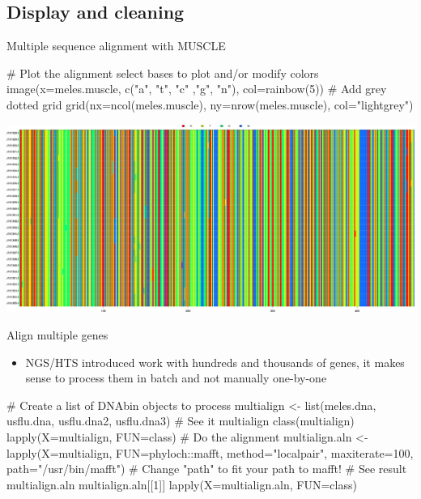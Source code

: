 \documentclass[compress, ucs, xelatex, 11pt, xcolor=svgnames,
  hyperref={
    bookmarks=true,
    unicode=true,
    colorlinks=true,
    pdftitle={Molecular data in R},
    plainpages=false,
    pdfauthor={Vojtech Zeisek},
    pdfsubject={Course about phylogeny and evolution in R},
    pdfcreator={XeLaTeX},
    pdfkeywords={R, evolution, phylogeny, molecular data},
    linkcolor=Tomato,
    anchorcolor=SaddleBrown,
    citecolor=Goldenrod,
    filecolor=DarkMagenta,
    menucolor=Sienna,
    urlcolor=DarkTurquoise,
    pdftex},
  url={hyphens, lowtilde} %
  ]{beamer}
\begin{document}
\subsection{Display and cleaning}

\begin{frame}[fragile]{Multiple sequence alignment with MUSCLE}
  \begin{spluscode}
    # Plot the alignment select bases to plot and/or modify colors
    image(x=meles.muscle, c("a", "t", "c" ,"g", "n"), col=rainbow(5))
    # Add grey dotted grid
    grid(nx=ncol(meles.muscle), ny=nrow(meles.muscle), col="lightgrey")
  \end{spluscode}
  \vfill
  \includegraphics[width=\textwidth]{muscle.png}
\end{frame}

\begin{frame}[fragile]{Align multiple genes}
  \begin{itemize}
    \item NGS/HTS introduced work with hundreds and thousands of genes, it makes sense to process them in batch and not manually one-by-one
  \end{itemize}
  \begin{spluscode}
    # Create a list of DNAbin objects to process
    multialign <- list(meles.dna, usflu.dna, usflu.dna2, usflu.dna3)
    # See it
    multialign
    class(multialign)
    lapply(X=multialign, FUN=class)
    # Do the alignment
    multialign.aln <- lapply(X=multialign, FUN=phyloch::mafft,
       method="localpair", maxiterate=100, path="/usr/bin/mafft")
      # Change "path" to fit your path to mafft!
    # See result
    multialign.aln
    multialign.aln[[1]]
    lapply(X=multialign.aln, FUN=class)
  \end{spluscode}
\end{frame}
\end{document}
